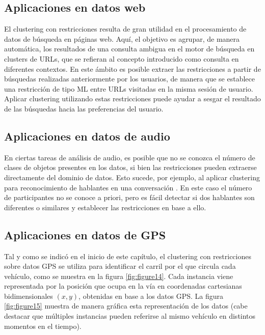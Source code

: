 \subsection{Aplicaciones en datos web} 

El clustering con restricciones resulta de gran utilidad en el procesamiento de datos de búsqueda en páginas web. Aquí, el objetivo es agrupar, de manera automática, los resultados de una consulta ambigua en el motor de búsqueda en clusters de \acs{URL}s, que se refieran al concepto introducido como consulta en diferentes contextos. En este ámbito es posible extraer las restricciones a partir de búsquedas realizadas anteriormente por los usuarios, de manera que se establece una restricción de tipo \acf{ML} entre \acs{URL}s visitadas en la misma sesión de usuario. Aplicar clustering utilizando estas restricciones puede ayudar a sesgar el resultado de las búsquedas hacia las preferencias del usuario.

\subsection{Aplicaciones en datos de audio}

En ciertas tareas de análisis de audio, es posible que no se conozca el número de clases de objetos presentes en los datos, si bien las restricciones pueden extraerse directamente del dominio de datos. Esto sucede, por ejemplo, al aplicar clustering para reconocimiento de hablantes en una conversación \cite{BarHillel:2003}. En este caso el número de participantes no se conoce a priori, pero es fácil detectar si dos hablantes son diferentes o similares y establecer las restricciones en base a ello.

\subsection{Aplicaciones en datos de GPS} \label{EjemploGPS}

Tal y como se indicó en el inicio de este capítulo, el clustering con restricciones sobre datos \acs{GPS} se utiliza para identificar el carril por el que circula cada vehículo, como se muestra en la figura \ref{fig:figure14}. Cada instancia viene representada por la posición que ocupa en la vía en coordenadas cartesianas bidimensionales $(x,y)$, obtenidas en base a los datos \acs{GPS}. La figura \ref{fig:figure15} muestra de manera gráfica esta representación de los datos (cabe destacar que múltiples instancias pueden referirse al mismo vehículo en distintos momentos en el tiempo).

